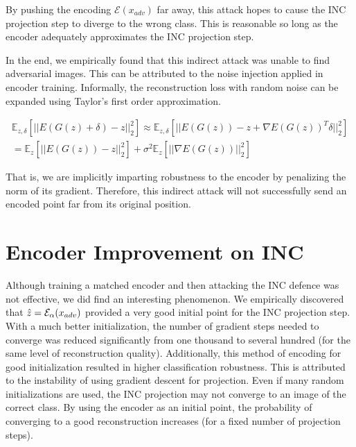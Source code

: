 \documentclass{article}
\theoremstyle{definition}
\begin{document}
By pushing the encoding $\mathcal{E}(x_{adv})$ far away, this attack hopes to cause the INC projection step to diverge to the wrong class. This is reasonable so long as the encoder adequately approximates the INC projection step. 

In the end, we empirically found that this indirect attack was unable to find adversarial images. This can be attributed to the noise injection applied in encoder training. Informally, the reconstruction loss with random noise can be expanded using Taylor's first order approximation. 

\begin{align*}
    \mathbb{E}_{z, \delta} [||E(G(z) + \delta) - z||_2^2] \approx \mathbb{E}_{z, \delta} [||E(G(z)) - z + \nabla E(G(z))^T \delta||_2^2] \\
    = \mathbb{E}_{z} [||E(G(z)) - z||_2^2] + \sigma^2 \mathbb{E}_{z} [||\nabla E(G(z))||_2^2]
\end{align*}

That is, we are implicitly imparting robustness to the encoder by penalizing the norm of its gradient. Therefore, this indirect attack will not successfully send an encoded point far from  its original position.

\section{Encoder Improvement on INC}
Although training a matched encoder and then attacking the INC defence was not effective, we did find an interesting phenomenon. We empirically discovered that $\Hat{z} =\mathcal{E}_{\alpha}(x_{adv})$ provided a very good initial point for the INC projection step. With a much better initialization, the number of gradient steps needed to converge was reduced significantly from one thousand to several hundred (for the same level of reconstruction quality). Additionally, this method of encoding for good initialization resulted in higher classification robustness. This is attributed to the instability of using gradient descent for projection. Even if many random initializations are used, the INC projection may not converge to an image of the correct class. By using the encoder as an initial point, the probability of  converging to a good reconstruction increases (for a fixed number of projection steps).
\end{document}
